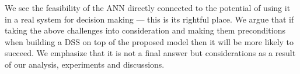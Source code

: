 We see the feasibility of the ANN directly connected to the potential of using it in a real system for decision making --- this is its rightful place. We argue that if taking the above challenges into consideration and making them preconditions when building a DSS on top of the proposed model then it will be more likely to succeed. We emphasize that it is not a final answer but considerations as a result of our analysis, experiments and discussions.



